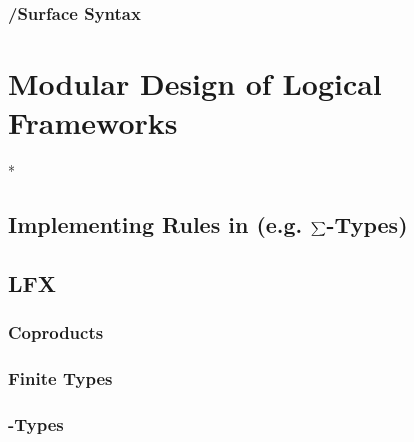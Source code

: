 \documentclass[a4paper,11pt]{book}
\begin{document}
\section{\mmt/\LF Surface Syntax}\label{sec:intro:prelim:syntax}




\part{Modular Design of Logical Frameworks}\label{ch:lf}






\lstMakeShortInline[language=scala]*

\chapter{Implementing Rules in \mmt (e.g. $\sum$-Types)}\label{sec:lf:lfx:sigma}


\chapter{LFX}\label{sec:lf:lfx}


\section{Coproducts}\label{sec:lf:lfx:coprod}


\section{Finite Types}\label{sec:lf:lfx:finite}


\section{\wtypesym-Types}\label{sec:lf:lfx:wtypes}

\end{document}

